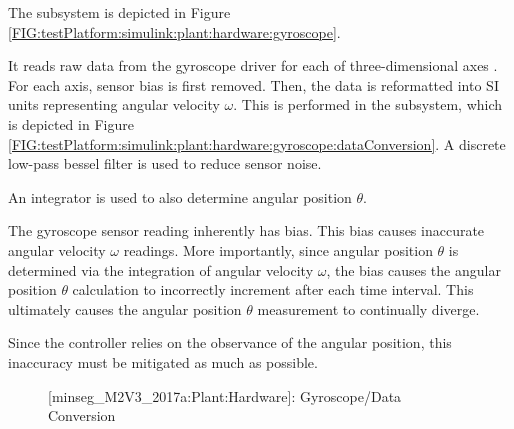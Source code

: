 \documentclass[crop=false,float=true,class=scrreprt]{standalone}
\begin{document}
\label{SEC:testPlatform:simulink:plant:hardware:gyroscope}

The  subsystem is depicted in Figure~%
\ref{FIG:testPlatform:simulink:plant:hardware:gyroscope}.

It reads raw data from the gyroscope driver for each of three-dimensional axes
{\fns[\tif{x, y, z}]}.
For each axis, sensor bias is first removed.
Then, the data is reformatted into SI units representing angular velocity $\omega$.
This is performed in the  subsystem,
which is depicted in Figure~%
\ref{FIG:testPlatform:simulink:plant:hardware:gyroscope:dataConversion}.
A discrete low-pass bessel filter is used to reduce sensor noise.
{}

An integrator is used to also determine angular position $\theta$.




\label{SEC:testPlatform:simulink:plant:hardware:gyroscope:bias}

The gyroscope sensor reading inherently has bias.
This bias causes inaccurate angular velocity $\omega$ readings.
More importantly, since angular position $\theta$ is determined 
via the integration of angular velocity $\omega$,
the bias causes the angular position $\theta$ calculation to incorrectly increment
after each time interval.
This ultimately causes the angular position $\theta$ measurement
to continually diverge.

Since the controller relies on the observance of the angular position,
this inaccuracy must be mitigated as much as possible.




\vspace*{\fill}
\begin{figure}[H]%
\centering%
%
\caption[{[minseg\_M2V3\_2017a:Plant:Hardware]: Gyroscope/Data Conversion}]%
        {{[minseg\_M2V3\_2017a:Plant:Hardware]: Gyroscope/Data Conversion%
          \label{SEC:testPlatform:simulink:plant:hardware:gyroscope:dataConversion}%
        }}%
\end{figure}
\vspace*{\fill}




\clearpage
\end{document}
